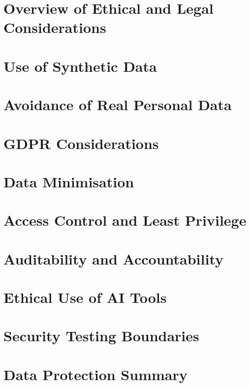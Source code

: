 
\raggedright

\section{Overview of Ethical and Legal Considerations}

\section{Use of Synthetic Data}

\section{Avoidance of Real Personal Data}

\section{GDPR Considerations}

\section{Data Minimisation}

\section{Access Control and Least Privilege}

\section{Auditability and Accountability}

\section{Ethical Use of AI Tools}

\section{Security Testing Boundaries}

\section{Data Protection Summary}